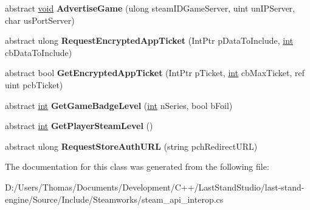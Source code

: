 \begin{DoxyCompactItemize}
\item 
\hypertarget{classValve_1_1Steamworks_1_1ISteamUser_a384df64decb0e3a8cd98379850c75cfc}{}abstract \hyperlink{SDL__audio_8h_a52835ae37c4bb905b903cbaf5d04b05f}{void} {\bfseries Advertise\+Game} (ulong steam\+I\+D\+Game\+Server, uint un\+I\+P\+Server, char us\+Port\+Server)\label{classValve_1_1Steamworks_1_1ISteamUser_a384df64decb0e3a8cd98379850c75cfc}

\item 
\hypertarget{classValve_1_1Steamworks_1_1ISteamUser_af2541afb349130a094e77774a7745534}{}abstract ulong {\bfseries Request\+Encrypted\+App\+Ticket} (Int\+Ptr p\+Data\+To\+Include, \hyperlink{SDL__thread_8h_a6a64f9be4433e4de6e2f2f548cf3c08e}{int} cb\+Data\+To\+Include)\label{classValve_1_1Steamworks_1_1ISteamUser_af2541afb349130a094e77774a7745534}

\item 
\hypertarget{classValve_1_1Steamworks_1_1ISteamUser_a7060ed868197c2b1bb0afe51b3bda0a6}{}abstract bool {\bfseries Get\+Encrypted\+App\+Ticket} (Int\+Ptr p\+Ticket, \hyperlink{SDL__thread_8h_a6a64f9be4433e4de6e2f2f548cf3c08e}{int} cb\+Max\+Ticket, ref uint pcb\+Ticket)\label{classValve_1_1Steamworks_1_1ISteamUser_a7060ed868197c2b1bb0afe51b3bda0a6}

\item 
\hypertarget{classValve_1_1Steamworks_1_1ISteamUser_ae64cf51b62da6a2ff243c359db757dea}{}abstract \hyperlink{SDL__thread_8h_a6a64f9be4433e4de6e2f2f548cf3c08e}{int} {\bfseries Get\+Game\+Badge\+Level} (\hyperlink{SDL__thread_8h_a6a64f9be4433e4de6e2f2f548cf3c08e}{int} n\+Series, bool b\+Foil)\label{classValve_1_1Steamworks_1_1ISteamUser_ae64cf51b62da6a2ff243c359db757dea}

\item 
\hypertarget{classValve_1_1Steamworks_1_1ISteamUser_ab48894c7ab54ad8f4e1721e5379ac36a}{}abstract \hyperlink{SDL__thread_8h_a6a64f9be4433e4de6e2f2f548cf3c08e}{int} {\bfseries Get\+Player\+Steam\+Level} ()\label{classValve_1_1Steamworks_1_1ISteamUser_ab48894c7ab54ad8f4e1721e5379ac36a}

\item 
\hypertarget{classValve_1_1Steamworks_1_1ISteamUser_ae5e14eb42ccd9cfce1ac88f7c68b0a75}{}abstract ulong {\bfseries Request\+Store\+Auth\+U\+R\+L} (string pch\+Redirect\+U\+R\+L)\label{classValve_1_1Steamworks_1_1ISteamUser_ae5e14eb42ccd9cfce1ac88f7c68b0a75}

\end{DoxyCompactItemize}


The documentation for this class was generated from the following file\+:\begin{DoxyCompactItemize}
\item 
D\+:/\+Users/\+Thomas/\+Documents/\+Development/\+C++/\+Last\+Stand\+Studio/last-\/stand-\/engine/\+Source/\+Include/\+Steamworks/steam\+\_\+api\+\_\+interop.\+cs\end{DoxyCompactItemize}
